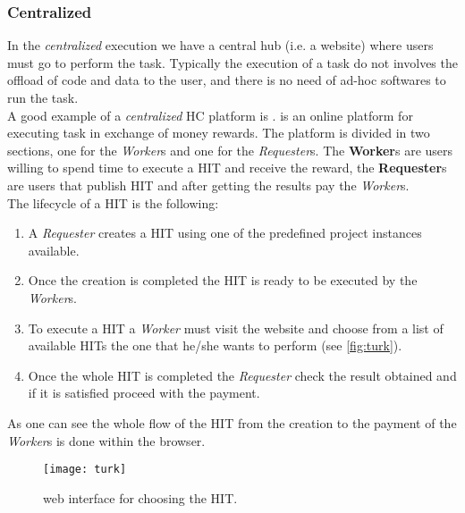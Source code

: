 \subsubsection{Centralized}
In the \emph{centralized} execution we have a central hub (i.e. a website) where
users must go to perform the task. Typically the execution of a task do not
involves the offload of code and data to the user, and there is no need of ad-hoc
softwares to run the task.\\

A good example of a \emph{centralized} \ac{HC} platform is .
 is an online platform for executing task in exchange of money
rewards. The platform is divided in two sections, one for the \emph{Worker}s and
one for the \emph{Requester}s. The \textbf{Worker}s are users willing to spend
time to execute a \ac{HIT} and receive the reward, the \textbf{Requester}s are
users that publish \ac{HIT} and after getting the results pay the \emph{Worker}s.\\

The lifecycle of a \ac{HIT} is the following:
\begin{enumerate}
    \item A \emph{Requester} creates a \ac{HIT} using one of the predefined project
    instances available.

    \item Once the creation is completed the \ac{HIT} is ready to be executed by
    the \emph{Worker}s.

    \item To execute a \ac{HIT} a \emph{Worker} must visit the 
    website and choose from a list of available \ac{HIT}s the one that he/she
    wants to perform (see \autoref{fig:turk}).

    \item Once the whole \ac{HIT} is completed the \emph{Requester} check the
    result obtained and if it is satisfied proceed with the payment.
\end{enumerate}
As one can see the whole flow of the \ac{HIT} from the creation to the payment
of the \emph{Worker}s is done within the browser.\\
\begin{figure}[htb]
    \centering
    \texttt{[image: turk]}
    \caption{ web interface for choosing the \acs{HIT}.}
    \label{fig:turk}
\end{figure}


